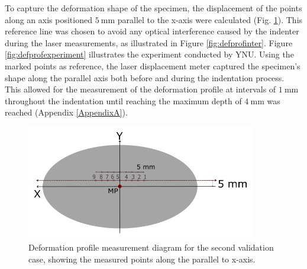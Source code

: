 To capture the deformation shape of the specimen, the displacement of the points along an axis positioned 
$\SI{5}{\milli \meter}$ parallel to the x-axis were calculated (Fig. \ref{fig:defprofdiagram}). %
This reference line was chosen to avoid any optical interference caused by the indenter during the 
laser measurements, as illustrated in Figure \ref{fig:defprofinter}.
Figure \ref{fig:defprofexperiment} illustrates the experiment conducted by YNU.
Using the marked points as reference, the laser displacement meter captured the specimen's 
shape along the parallel axis both before and during the indentation process.
This allowed for the measurement of the deformation profile at intervals of $\SI{1}{\milli \meter}$
throughout the indentation until reaching the maximum depth of $\SI{4}{\milli \meter}$ was reached (Appendix \ref{AppendixA}).\\

\begin{figure}%
	\centering
   \quad
   \includegraphics[width=10cm]{Images/validationcase/defprof/defprofdiag.png}%
   \caption[Deformation profile - Diagram]{Deformation profile measurement diagram for the second validation case, showing the measured points along the parallel to x-axis.}%
   \label{fig:defprofdiagram}%
\end{figure}

